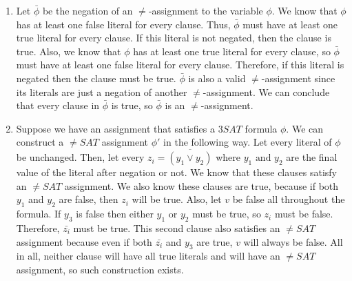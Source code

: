 \begin{solution}

\begin{enumerate}
	\item Let $\bar{\phi}$ be the negation of an $\ne$-{assignment} to the variable $\phi$. We know that $\phi$ has at least one false literal for every clause. Thus, $\bar{\phi}$ must have at least one true literal for every clause. If this literal is not negated, then the clause is true. Also, we know that $\phi$ has at least one true literal for every clause, so $\bar{\phi}$ must have at least one false literal for every clause. Therefore, if this literal is negated then the clause must be true. $\bar{\phi}$ is also a valid $\ne$-{assignment} since its literals are just a negation of another $\ne$-{assignment}. We can conclude that every clause in $\bar{\phi}$ is true, so $\bar{\phi}$ is an $\ne$-{assignment}.
	\item Suppose we have an assignment that satisfies a $3SAT$ formula $\phi$. We can construct a $\ne${$SAT$} assignment $\phi'$ in the following way. Let every literal of $\phi$ be unchanged. Then, let every $z_i = \overline{(y_1 \vee y_2)}$ where $y_1 \mbox{ and } y_2$ are the final value of the literal after negation or not. We know that these clauses satisfy an $\ne${$SAT$} assignment. We also know these clauses are true, because if both $y_1$ and $y_2$ are false, then $z_i$ will be true. Also, let $v$ be false all throughout the formula. If $y_3$ is false then either $y_1$ or $y_2$ must be true, so $z_i$ must be false. Therefore, $\bar{z_i}$ must be true. This second clause also satisfies an $\ne${$SAT$} assignment because even if both $\bar{z_i}$ and $y_3$ are true, $v$ will always be false. All in all, neither clause will have all true literals and will have an $\ne${$SAT$} assignment, so such construction exists.
\end{enumerate}

\end{solution}
